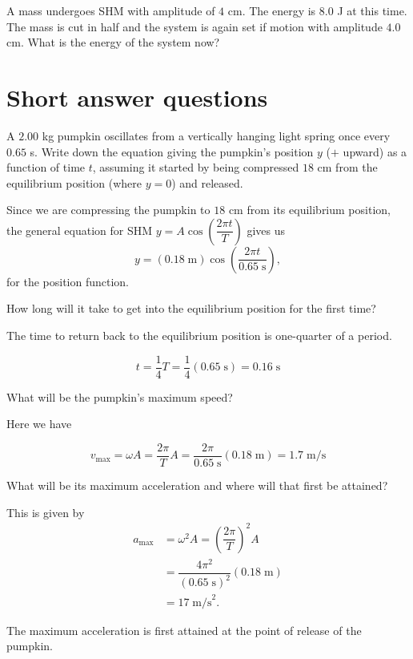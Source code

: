 \documentclass{ximera}
\begin{document}
\begin{question}
 A mass undergoes SHM with amplitude of $4$ cm. The energy is $8.0$ J at this time. The mass is cut in half and
the system is again set if motion with amplitude $4.0$ cm. What is the energy of the system now?
\begin{solution}
\begin{multiple-choice}
\end{multiple-choice}
\end{solution}
\end{question}

\section*{Short answer questions}
\begin{question}
A $2.00$ kg pumpkin oscillates from a vertically hanging light spring once every $0.65$ s. Write down the equation giving the pumpkin's position $y$ ($+$ upward) as a function of time $t$, assuming it started
by being compressed $18$ cm from the equilibrium position (where $y=0$) and released.
\begin{solution}
Since we are compressing the pumpkin to $18$ cm from its equilibrium position, the general equation for SHM $y=A\cos\left(\dfrac{2\pi t}{T}\right)$ gives
us
$$
y=(0.18\;\text{m})\cos\left(\dfrac{2\pi t}{0.65\;\text{s}}\right),
$$
for the position function.
\end{solution}
How long will it take to get into the equilibrium position for the first time?
\begin{solution}
The time to return back to the equilibrium position is one-quarter of a period.

$$
t=\dfrac{1}{4}T=\dfrac{1}{4}(0.65\;\text{s})=\boxed{0.16\;\text{s}}
$$

\end{solution}
What will be the pumpkin's maximum speed?
\begin{solution}
Here we have

$$
v_{\text{max}}=\omega A=\dfrac{2\pi}{T}A=\dfrac{2\pi}{0.65\;\text{s}}(0.18\;\text{m})=\boxed{1.7\;\text{m/s}}
$$
\end{solution}
What will be its maximum acceleration and where will that first be attained?
\begin{solution}
This is given by
\begin{align*}
a_{\text{max}}&=\omega^2 A=\left(\dfrac{{2\pi}}{T}\right)^2A\\
&=\dfrac{4\pi^2}{(0.65\;\text{s})^2}(0.18\;\text{m})\\
&=\boxed{17\;\text{m/s}^2}.
\end{align*}

The maximum acceleration is first attained at the point of release of the pumpkin.
\end{solution}
\end{question}
\end{document}
